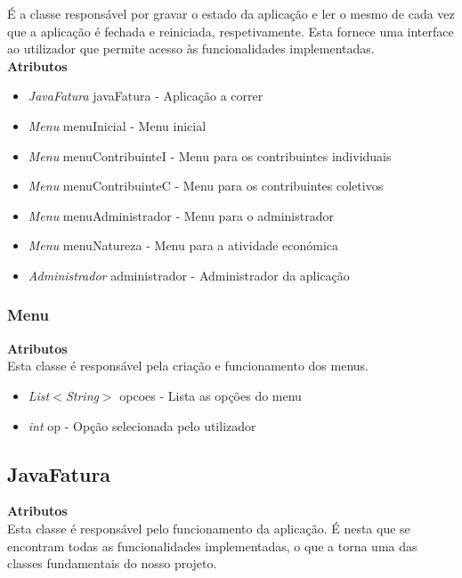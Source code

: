 \documentclass[10pt,a4paper]{article}
\begin{document}
É a classe responsável por gravar o estado da aplicação e ler o mesmo de cada vez que a aplicação é fechada e reiniciada, respetivamente. Esta fornece uma interface ao utilizador que permite acesso às funcionalidades implementadas.\\

{\bf{Atributos}}

\begin{itemize}
 \item \textit{JavaFatura} javaFatura - Aplicação a correr
 \item \textit{Menu} menuInicial - Menu inicial
 \item \textit{Menu} menuContribuinteI - Menu para os contribuintes individuais
 \item \textit{Menu} menuContribuinteC - Menu para os contribuintes coletivos
 \item \textit{Menu} menuAdministrador - Menu para o administrador
 \item \textit{Menu} menuNatureza - Menu para a atividade económica
 \item \textit{Administrador} administrador - Administrador da aplicação
\end{itemize}

\subsubsection{Menu}

{\bf{Atributos}}\\

Esta classe é responsável pela criação e funcionamento dos menus. 

\begin{itemize}
 \item \textit{List$<$String$>$} opcoes - Lista as opções do menu
 \item \textit{int} op - Opção selecionada pelo utilizador
\end{itemize}

\subsection{JavaFatura}
\label{sec:solucao}

{\bf{Atributos}}\\

Esta classe é responsável pelo funcionamento da aplicação. É nesta que se encontram todas as funcionalidades implementadas, o que a torna uma das classes fundamentais do nosso projeto. 
\end{document}
